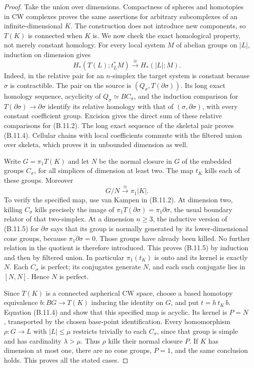 \begin{proof}
Take the union over dimensions. Compactness of spheres and
homotopies in CW complexes proves the same assertions for
arbitrary subcomplexes of an infinite-dimensional $K$.
The construction does not introduce new components, so
$T(K)$ is connected when $K$ is. We now check the exact
homological property, not merely constant homology. For
every local system $M$ of abelian groups on $|L|$, induction
on dimension gives
\[
 H_*(T(L);t_L^*M)\xrightarrow{\ \cong\ }H_*(|L|;M).
 \tag{B.11.4}
\]
Indeed, in the relative pair for an $n$-simplex the target
system is constant because $\sigma$ is contractible. The
pair on the source is $(Q_\sigma,T(\partial\sigma))$.
Its long exact homology sequence, acyclicity of
$Q_\sigma\simeq BC_\sigma$, and the induction comparison
for $T(\partial\sigma)\to\partial\sigma$ identify its
relative homology with that of $(\sigma,\partial\sigma)$,
with every constant coefficient group. Excision gives the
direct sum of these relative comparisons for (B.11.2).
The long exact sequence of the skeletal pair proves
(B.11.4). Cellular chains with local coefficients commute
with the filtered union over skeleta, which proves it in
unbounded dimension as well.

Write $G=\pi_1T(K)$ and let $N$ be the normal closure in
$G$ of the embedded groups $C_\sigma$, for all simplices
of dimension at least two. The map $t_K$ kills each of
these groups. Moreover
\[
 G/N\xrightarrow{\ \cong\ }\pi_1|K|.
 \tag{B.11.5}
\]
To verify the specified map, use van Kampen in (B.11.2).
At dimension two, killing $C_\sigma$ kills precisely
the image of $\pi_1T(\partial\sigma)=\pi_1\partial\sigma$,
the usual boundary relator of that two-simplex. At a
dimension $n\geq3$, the inductive version of (B.11.5)
for $\partial\sigma$ says that its group is normally
generated by its lower-dimensional cone groups, because
$\pi_1\partial\sigma=0$. Those groups have already been
killed. No further relation in the quotient is therefore
introduced. This proves (B.11.5) by induction and then by
filtered union. In particular $\pi_1(t_K)$ is onto and
its kernel is exactly $N$. Each $C_\sigma$ is perfect;
its conjugates generate $N$, and each such conjugate lies
in $[N,N]$. Hence $N$ is perfect.

Since $T(K)$ is a connected aspherical CW space, choose
a based homotopy equivalence $b:BG\to T(K)$ inducing the
identity on $G$, and put $t=h\,t_K\,b$. Equation (B.11.4)
and \citet[Definition/Proposition~1.2]{HausmannHusemoller1979}
show that this specified map is acyclic. Its kernel is
$P=N$, transported by the chosen base-point identification.
Every homomorphism $\rho:G\to L$ with $|L|\leq\mu$
restricts trivially to each $C_\sigma$, since that group
is simple and has cardinality $\lambda>\mu$. Thus $\rho$
kills their normal closure $P$. If $K$ has dimension at
most one, there are no cone groups, $P=1$, and the same
conclusion holds. This proves all the stated cases.
\end{proof}

